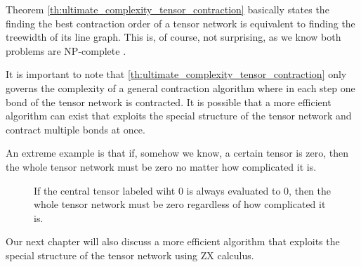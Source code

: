 Theorem \ref{th:ultimate_complexity_tensor_contraction} basically states the finding the best contraction order of a tensor network is equivalent to finding the treewidth of its line graph. 
This is, of course, not surprising, as we know both problems are NP-complete \cite{treewidthNPComplete} \cite{NPcomplete_tensor_network_contraction}.


It is important to note that \ref{th:ultimate_complexity_tensor_contraction} only governs the complexity of a general contraction algorithm where in each step one bond of the tensor network is contracted.
It is possible that a more efficient algorithm can exist that exploits the special structure of the tensor network and contract multiple bonds at once.

An extreme example is that if, somehow we know, a certain tensor is zero, then the whole tensor network must be zero no matter how complicated it is.

\begin{figure}[ht]
	\centering
	
	\caption{If the central tensor labeled wiht $0$ is always evaluated to 0, then the whole tensor network must be zero regardless of how complicated it is.}
	\label{fig:zero_tensor_network} 
\end{figure}

Our next chapter will also discuss a more efficient algorithm that exploits the special structure of the tensor network using ZX calculus.
